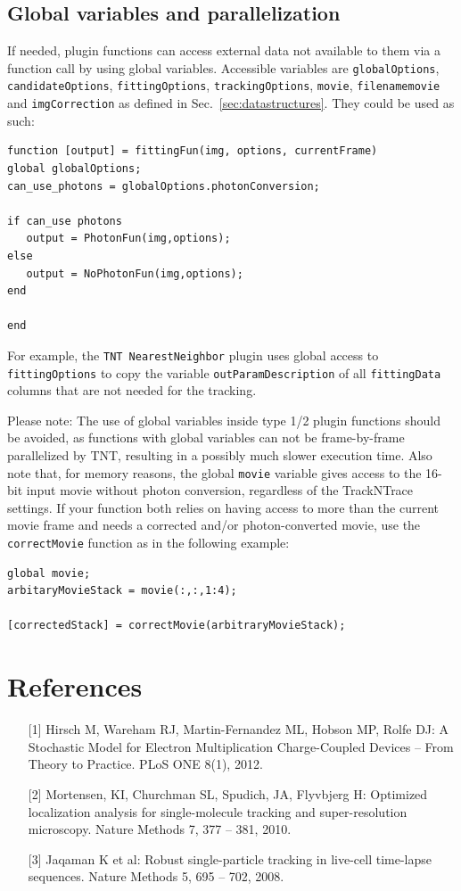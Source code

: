 \documentclass[11pt,onside]{report}
\numberwithin{equation}{chapter}
\begin{document}
\subsection{Global variables and parallelization}
If needed, plugin functions can access external data not available to them via a function call by using global variables. Accessible variables are \texttt{globalOptions}, \texttt{candidateOptions}, \texttt{fittingOptions}, \texttt{trackingOptions}, \texttt{movie}, \texttt{filename\textunderscore movie} and \texttt{imgCorrection} as defined in Sec.~\ref{sec:datastructures}. They could be used as such:
\begin{lstlisting}[style=Matlab-editor]
function [output] = fittingFun(img, options, currentFrame)
global globalOptions;
can_use_photons = globalOptions.photonConversion;

if can_use photons
   output = PhotonFun(img,options);
else
   output = NoPhotonFun(img,options);
end

end
\end{lstlisting}
For example, the \texttt{TNT NearestNeighbor} plugin uses global access to \texttt{fittingOptions} to copy the variable \texttt{outParamDescription} of all \texttt{fittingData} columns that are not needed for the tracking. 

Please note: The use of global variables inside type 1/2 plugin functions should be avoided, as functions with global variables can not be frame-by-frame parallelized by TNT, resulting in a possibly much slower execution time. Also note that, for memory reasons, the global \texttt{movie} variable gives access to the 16-bit input movie without photon conversion, regardless of the TrackNTrace settings. If your function both relies on having access to more than the current movie frame and needs a corrected and/or photon-converted movie, use the \texttt{correctMovie} function as in the following example:
\begin{lstlisting}[style=Matlab-editor]
global movie;
arbitaryMovieStack = movie(:,:,1:4);

[correctedStack] = correctMovie(arbitraryMovieStack);
\end{lstlisting}

\clearpage

\section{References}
\begin{itemize}
\item [{[1]}]  Hirsch M, Wareham RJ, Martin-Fernandez ML, Hobson MP, Rolfe DJ: A Stochastic Model for Electron Multiplication Charge-Coupled Devices {--} From Theory to Practice. PLoS ONE 8(1), 2012.
\item [{[2]}] Mortensen, KI, Churchman SL, Spudich, JA, Flyvbjerg H: Optimized localization analysis for single-molecule tracking and super-resolution microscopy. Nature Methods 7, 377 {--} 381, 2010.
\item [{[3]}] Jaqaman K et al: Robust single-particle tracking in live-cell time-lapse sequences. Nature Methods 5, 695 {--} 702, 2008.

\end{itemize}
\end{document}
